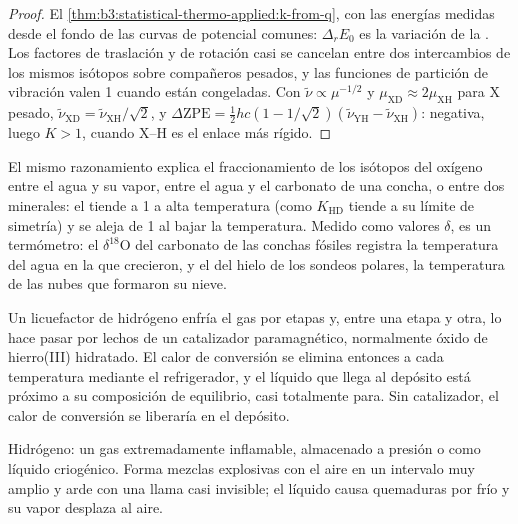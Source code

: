 \begin{proof}
El \cref{thm:b3:statistical-thermo-applied:k-from-q}, con las energías medidas
desde el fondo de las curvas de potencial comunes: $\Delta_rE_0$ es la variación de la
. Los factores de traslación y de rotación casi se cancelan
entre dos intercambios de los mismos isótopos sobre compañeros pesados, y las
funciones de partición de vibración valen 1 cuando están congeladas. Con $\tilde\nu \propto \mu^{-1/2}$ y
$\mu_{\mathrm{XD}} \approx 2\mu_{\mathrm{XH}}$ para X pesado, $\tilde\nu_{\mathrm{XD}} = \tilde\nu_{\mathrm{XH}}/\sqrt2$, y $\Delta\mathrm{ZPE} =
\frac12hc(1 - 1/\sqrt2)(\tilde\nu_{\mathrm{YH}} - \tilde\nu_{\mathrm{XH}})$: negativa, luego $K > 1$, cuando X--H es el
enlace más rígido.
\end{proof}

El mismo razonamiento explica el fraccionamiento de los isótopos del oxígeno entre el agua
y su vapor, entre el agua y el carbonato de una concha, o entre dos
minerales: el  tiende a 1 a alta temperatura (como
$K_{\mathrm{HD}}$ tiende a su límite de simetría) y se aleja de 1 al bajar la
temperatura. Medido como valores $\delta$, es un termómetro: el $\delta^{18}$O del carbonato
de las conchas fósiles registra la temperatura del agua en la que crecieron, y
el del hielo de los sondeos polares, la temperatura de las nubes que formaron su
nieve.

\begin{inthelab}
Un licuefactor de hidrógeno enfría el gas por etapas y, entre una etapa y otra, lo hace pasar
por lechos de un catalizador paramagnético, normalmente óxido de hierro(III) hidratado.
El calor de conversión se elimina entonces a cada temperatura mediante el refrigerador,
y el líquido que llega al depósito está próximo a su composición de equilibrio,
casi totalmente para. Sin catalizador, el calor de conversión se
liberaría en el depósito.
\end{inthelab}

\begin{safety}{}
Hidrógeno: un gas extremadamente inflamable, almacenado a presión o como líquido
criogénico. Forma mezclas explosivas con el aire en un intervalo muy amplio y arde
con una llama casi invisible; el líquido causa quemaduras por frío y su vapor
desplaza al aire.
\end{safety}

